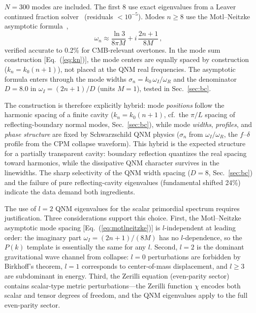 \documentclass[aps,prd,twocolumn,superscriptaddress,showpacs,preprintnumbers,amsmath,amssymb,nofootinbib]{revtex4-2}
\begin{document}
$N = 300$ modes are included. The first 8 use exact eigenvalues from a Leaver continued fraction solver~\cite{Leaver1985} (residuals $< 10^{-5}$). Modes $n \geq 8$ use the Motl--Neitzke asymptotic formula~\cite{MotlNeitzke2003},
\begin{equation}
\label{eq:motlneitzke}
\omega_n \approx \frac{\ln 3}{8\pi M} + i\,\frac{2n + 1}{8M}\,,
\end{equation}
verified accurate to 0.2\% for CMB-relevant overtones. In the mode sum construction [Eq.~(\ref{eq:kn})], the mode centers are equally spaced by construction ($k_n = k_0(n+1)$), not placed at the QNM real frequencies. The asymptotic formula enters through the mode widths $\sigma_n = k_0\,\omega_I/\omega_R$ and the denominator $D = 8.0$ in $\omega_I = (2n+1)/D$ (units $M = 1$), tested in Sec.~\ref{sec:bc}.

The construction is therefore explicitly hybrid: mode \emph{positions} follow the harmonic spacing of a finite cavity ($k_n = k_0(n+1)$, cf.\ the $\pi/L$ spacing of reflecting-boundary normal modes, Sec.~\ref{sec:bc}), while mode \emph{widths}, \emph{profiles}, and \emph{phase structure} are fixed by Schwarzschild QNM physics ($\sigma_n$ from $\omega_I/\omega_R$, the $f$--$\delta$ profile from the CPM collapse waveform). This hybrid is the expected structure for a partially transparent cavity: boundary reflection quantizes the real spacing toward harmonics, while the dissipative QNM character survives in the linewidths. The sharp selectivity of the QNM width spacing ($D = 8$, Sec.~\ref{sec:bc}) and the failure of pure reflecting-cavity eigenvalues (fundamental shifted 24\%) indicate the data demand both ingredients.

The use of $l = 2$ QNM eigenvalues for the scalar primordial spectrum requires justification. Three considerations support this choice. First, the Motl--Neitzke asymptotic mode spacing [Eq.~(\ref{eq:motlneitzke})] is $l$-independent at leading order: the imaginary part $\omega_I = (2n+1)/(8M)$ has no $l$-dependence, so the $P(k)$ template is essentially the same for any $l$. Second, $l = 2$ is the dominant gravitational wave channel from collapse: $l = 0$ perturbations are forbidden by Birkhoff's theorem, $l = 1$ corresponds to center-of-mass displacement, and $l \geq 3$ are subdominant in energy. Third, the Zerilli equation (even-parity sector) contains scalar-type metric perturbations---the Zerilli function $\chi$ encodes both scalar and tensor degrees of freedom, and the QNM eigenvalues apply to the full even-parity sector.
\end{document}
